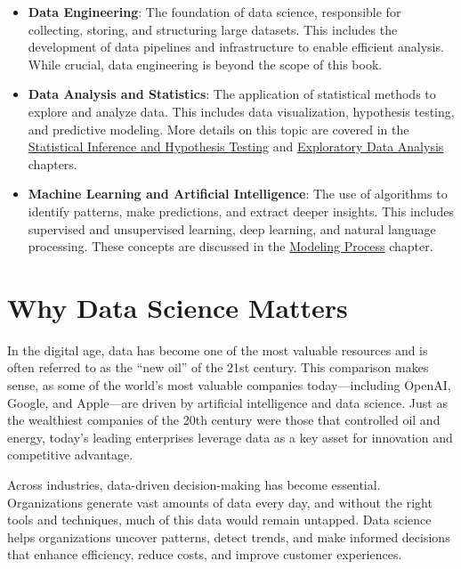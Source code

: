 \documentclass[
]{book}
\providecommand{\tightlist}{%
  \setlength{\itemsep}{0pt}\setlength{\parskip}{0pt}}
\theoremstyle{definition}
\theoremstyle{definition}
\theoremstyle{definition}
\theoremstyle{definition}
\theoremstyle{remark}
\begin{document}
\begin{itemize}
\tightlist
\item
  \textbf{Data Engineering}: The foundation of data science, responsible for collecting, storing, and structuring large datasets. This includes the development of data pipelines and infrastructure to enable efficient analysis. While crucial, data engineering is beyond the scope of this book.\\
\item
  \textbf{Data Analysis and Statistics}: The application of statistical methods to explore and analyze data. This includes data visualization, hypothesis testing, and predictive modeling. More details on this topic are covered in the \hyperref[chapter-statistics]{Statistical Inference and Hypothesis Testing} and \hyperref[chapter-EDA]{Exploratory Data Analysis} chapters.\\
\item
  \textbf{Machine Learning and Artificial Intelligence}: The use of algorithms to identify patterns, make predictions, and extract deeper insights. This includes supervised and unsupervised learning, deep learning, and natural language processing. These concepts are discussed in the \hyperref[chapter-modeling]{Modeling Process} chapter.
\end{itemize}

\section{Why Data Science Matters}\label{why-data-science-matters}

In the digital age, data has become one of the most valuable resources and is often referred to as the ``new oil'' of the 21st century. This comparison makes sense, as some of the world's most valuable companies today---including OpenAI, Google, and Apple---are driven by artificial intelligence and data science. Just as the wealthiest companies of the 20th century were those that controlled oil and energy, today's leading enterprises leverage data as a key asset for innovation and competitive advantage.

Across industries, data-driven decision-making has become essential. Organizations generate vast amounts of data every day, and without the right tools and techniques, much of this data would remain untapped. Data science helps organizations uncover patterns, detect trends, and make informed decisions that enhance efficiency, reduce costs, and improve customer experiences.
\end{document}
